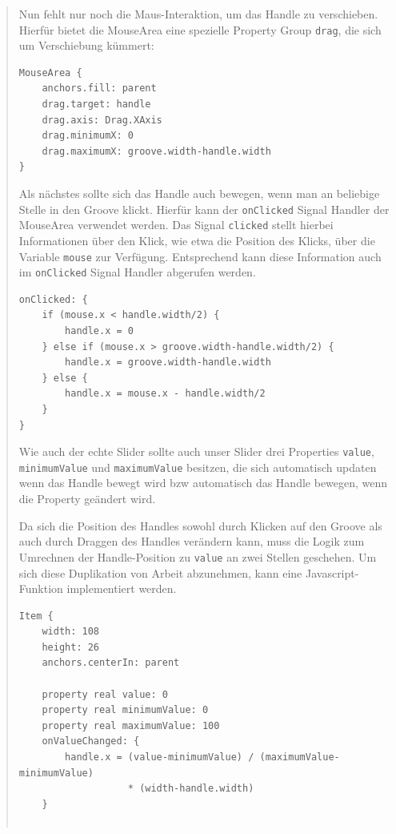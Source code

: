\documentclass[a4paper]{article}
\begin{document}
\begin{quote}
Nun fehlt nur noch die Maus-Interaktion, um das Handle zu verschieben. Hierfür bietet die MouseArea eine spezielle Property Group \verb~drag~, die sich um Verschiebung kümmert:

\begin{verbatim}
MouseArea {
    anchors.fill: parent
    drag.target: handle
    drag.axis: Drag.XAxis
    drag.minimumX: 0
    drag.maximumX: groove.width-handle.width
}
\end{verbatim}

Als nächstes sollte sich das Handle auch bewegen, wenn man an beliebige Stelle in den Groove klickt. Hierfür kann der \verb~onClicked~ Signal Handler der MouseArea verwendet werden. Das Signal \verb~clicked~ stellt hierbei Informationen über den Klick, wie etwa die Position des Klicks, über die Variable \verb~mouse~ zur Verfügung. Entsprechend kann diese Information auch im \verb~onClicked~ Signal Handler abgerufen werden.

\begin{verbatim}
onClicked: {
    if (mouse.x < handle.width/2) {
        handle.x = 0
    } else if (mouse.x > groove.width-handle.width/2) {
        handle.x = groove.width-handle.width
    } else {
        handle.x = mouse.x - handle.width/2
    }
}
\end{verbatim}

Wie auch der echte Slider sollte auch unser Slider drei Properties \verb~value~, \verb~minimumValue~ und \verb~maximumValue~ besitzen, die sich automatisch updaten wenn das Handle bewegt wird bzw automatisch das Handle bewegen, wenn die Property geändert wird.

Da sich die Position des Handles sowohl durch Klicken auf den Groove als auch durch Draggen des Handles verändern kann, muss die Logik zum Umrechnen der Handle-Position zu \verb~value~ an zwei Stellen geschehen. Um sich diese Duplikation von Arbeit abzunehmen, kann eine Javascript-Funktion implementiert werden.

\begin{verbatim}
Item {
    width: 108
    height: 26
    anchors.centerIn: parent

    property real value: 0
    property real minimumValue: 0
    property real maximumValue: 100
    onValueChanged: {
        handle.x = (value-minimumValue) / (maximumValue-minimumValue)
                   * (width-handle.width)
    }


\end{verbatim}
\end{quote}
\end{document}

